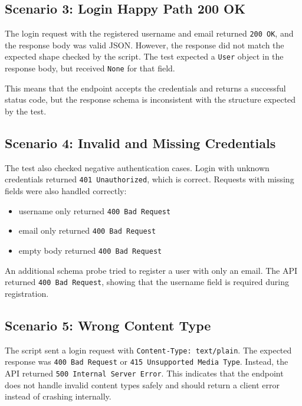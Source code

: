 \subsection{Scenario 3: Login Happy Path 200 OK}

The login request with the registered username and email returned \texttt{200 OK}, and the response body was valid JSON. However, the response did not match the expected shape checked by the script. The test expected a \texttt{User} object in the response body, but received \texttt{None} for that field.

This means that the endpoint accepts the credentials and returns a successful status code, but the response schema is inconsistent with the structure expected by the test.

\subsection{Scenario 4: Invalid and Missing Credentials}

The test also checked negative authentication cases. Login with unknown credentials returned \texttt{401 Unauthorized}, which is correct. Requests with missing fields were also handled correctly:

\begin{itemize}
    \item username only returned \texttt{400 Bad Request}
    \item email only returned \texttt{400 Bad Request}
    \item empty body returned \texttt{400 Bad Request}
\end{itemize}

An additional schema probe tried to register a user with only an email. The API returned \texttt{400 Bad Request}, showing that the username field is required during registration.

\subsection{Scenario 5: Wrong Content Type}

The script sent a login request with \texttt{Content-Type: text/plain}. The expected response was \texttt{400 Bad Request} or \texttt{415 Unsupported Media Type}. Instead, the API returned \texttt{500 Internal Server Error}. This indicates that the endpoint does not handle invalid content types safely and should return a client error instead of crashing internally.

